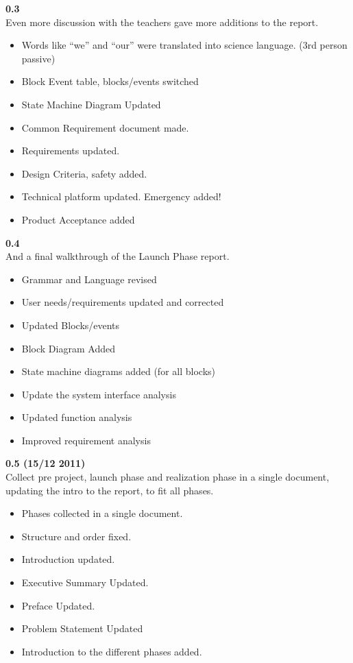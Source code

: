 \textbf{0.3}\\

Even more discussion with the teachers gave more additions to the report.
\begin{itemize}
\item Words like “we” and “our” were translated into science language. (3rd person passive)
\item Block Event table, blocks/events switched
\item State Machine Diagram Updated
\item Common Requirement document made.
\item Requirements updated.
\item Design Criteria, safety added.
\item Technical platform updated. Emergency added!
\item Product Acceptance added
\end{itemize}

\textbf{0.4}\\
And a final walkthrough of the Launch Phase report.
\begin{itemize}
\item Grammar and Language revised
\item User needs/requirements updated and corrected
\item Updated Blocks/events
\item Block Diagram Added
\item State machine diagrams added (for all blocks)
\item Update the system interface analysis
\item Updated function analysis
\item Improved requirement analysis
\end{itemize}

\textbf{0.5 (15/12 2011)}\\

Collect pre project, launch phase and realization phase in a single document, updating the intro to the report, to fit all phases.
\begin{itemize}
\item Phases collected in a single document.
\item Structure and order fixed.
\item Introduction updated.
\item Executive Summary Updated.
\item Preface Updated.
\item Problem Statement Updated
\item Introduction to the different phases added.
\end{itemize}

